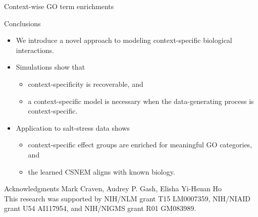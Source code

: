 \documentclass[aspectratio=169]{beamer}
\begin{document}
\begin{frame}{Context-wise GO term enrichments}
\end{frame}


\begin{frame}{Conclusions}
 \begin{itemize}
  \item We introduce a novel approach to modeling context-specific biological interactions.
  \pause
  \item Simulations show that
  \begin{itemize}
   \item context-specificity is recoverable, and
   \item a context-specific model is necessary when the data-generating process is context-specific.
  \end{itemize}
  \item Application to salt-stress data shows
  \begin{itemize}
   \item context-specific effect groups are enriched for meaningful GO categories, and
   \item the learned CSNEM aligns with known biology.
  \end{itemize}
 \end{itemize}
 \pause
 \begin{block}{Acknowledgments}
   Mark Craven, Audrey P. Gash, Elisha Yi-Hsuan Ho \\
   \scriptsize
   \color{UWRed}
   This research was supported by NIH/NLM grant T15 LM0007359, NIH/NIAID grant U54 AI117954, and NIH/NIGMS grant R01 GM083989.
 \end{block}
\end{frame}
\end{document}
